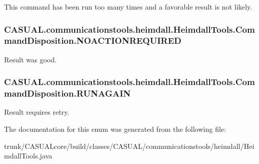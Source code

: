 This command has been run too many times and a favorable result is not likely. \hypertarget{enum_c_a_s_u_a_l_1_1communicationstools_1_1heimdall_1_1_heimdall_tools_1_1_command_disposition_a0ebc34041019a8eabf595f1ffe000bbe}{
\subsubsection[{N\-O\-A\-C\-T\-I\-O\-N\-R\-E\-Q\-U\-I\-R\-E\-D}]{\setlength{\rightskip}{0pt plus 5cm}C\-A\-S\-U\-A\-L.\-communicationstools.\-heimdall.\-Heimdall\-Tools.\-Command\-Disposition.\-N\-O\-A\-C\-T\-I\-O\-N\-R\-E\-Q\-U\-I\-R\-E\-D}}\label{enum_c_a_s_u_a_l_1_1communicationstools_1_1heimdall_1_1_heimdall_tools_1_1_command_disposition_a0ebc34041019a8eabf595f1ffe000bbe}
Result was good. \hypertarget{enum_c_a_s_u_a_l_1_1communicationstools_1_1heimdall_1_1_heimdall_tools_1_1_command_disposition_af7c6c32e63677f4cd76c37549fece3bf}{
\subsubsection[{R\-U\-N\-A\-G\-A\-I\-N}]{\setlength{\rightskip}{0pt plus 5cm}C\-A\-S\-U\-A\-L.\-communicationstools.\-heimdall.\-Heimdall\-Tools.\-Command\-Disposition.\-R\-U\-N\-A\-G\-A\-I\-N}}\label{enum_c_a_s_u_a_l_1_1communicationstools_1_1heimdall_1_1_heimdall_tools_1_1_command_disposition_af7c6c32e63677f4cd76c37549fece3bf}
Result requires retry. 

The documentation for this enum was generated from the following file\-:\begin{DoxyCompactItemize}
\item 
trunk/\-C\-A\-S\-U\-A\-Lcore/build/classes/\-C\-A\-S\-U\-A\-L/communicationstools/heimdall/Heimdall\-Tools.\-java\end{DoxyCompactItemize}
